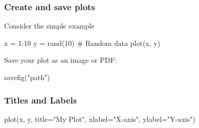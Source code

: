 \documentclass{report}
\begin{document}
     \subsubsection{Create and save plots}
     \bigbreak \noindent 
     Consider the simple example
     \bigbreak \noindent 
     \begin{jlcode}
         x = 1:10
         y = rand(10)  # Random data
         plot(x, y)
     \end{jlcode}
     \bigbreak \noindent 
     Save your plot as an image or PDF:
     \bigbreak \noindent 
     \begin{jlcode}
     savefig("path")
     \end{jlcode}
     \bigbreak \noindent 
     \bigbreak \noindent 
     \subsubsection{Titles and Labels}
     \bigbreak \noindent 
     \begin{jlcode}
     plot(x, y, title="My Plot", xlabel="X-axis", ylabel="Y-axis")
     \end{jlcode}
     \bigbreak \noindent 
\end{document}
